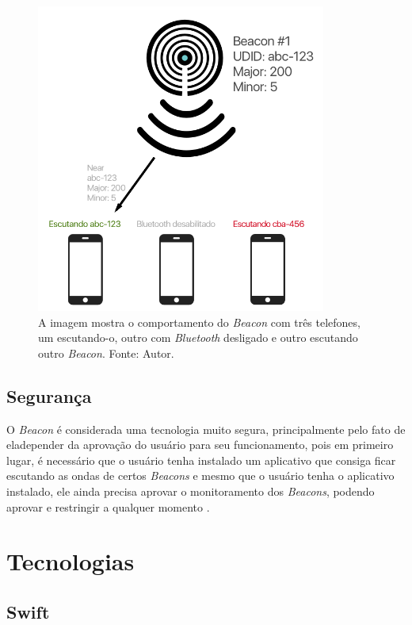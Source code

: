 \documentclass[
	12pt,
	oneside,
	a4paper,
	english,
	brazil,
]{abntex2}
\begin{document}
\begin{figure}[h]
\centering
\includegraphics[width=0.85\textwidth]{beacon-how-it-works}
    \caption{
        A imagem mostra o comportamento do \emph{Beacon} com três telefones, um escutando-o, outro com \emph{Bluetooth} desligado e outro escutando outro \emph{Beacon}. Fonte: Autor.
    }
\end{figure}

\subsection{Segurança}

O \emph{Beacon} é considerada uma tecnologia muito segura, principalmente pelo fato de eladepender da aprovação do usuário para seu funcionamento, pois em primeiro lugar, é necessário que o usuário tenha instalado um aplicativo que consiga ficar escutando as ondas de certos \emph{Beacons} e mesmo que o usuário tenha o aplicativo instalado, ele ainda precisa aprovar o monitoramento dos \emph{Beacons}, podendo aprovar e restringir a qualquer momento \cite{beacon-what-is-it-forbes}.

\section{Tecnologias}

\subsection{Swift}
\end{document}
